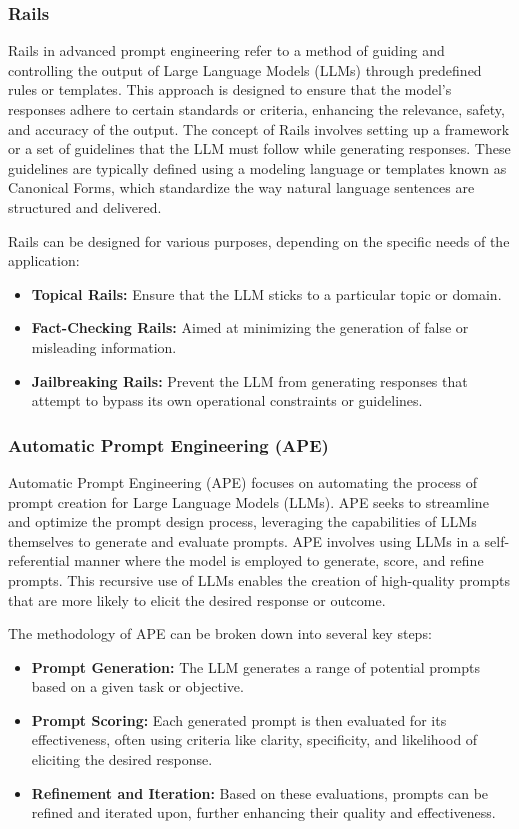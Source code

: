 \documentclass[conference]{IEEEtran}
\begin{document}
\subsubsection{Rails}
Rails in advanced prompt engineering refer to a method of guiding and controlling the output of Large Language Models (LLMs) through predefined rules or templates. This approach is designed to ensure that the model's responses adhere to certain standards or criteria, enhancing the relevance, safety, and accuracy of the output. The concept of Rails involves setting up a framework or a set of guidelines that the LLM must follow while generating responses. These guidelines are typically defined using a modeling language or templates known as Canonical Forms, which standardize the way natural language sentences are structured and delivered.

Rails can be designed for various purposes, depending on the specific needs of the application:
\begin{itemize}
    \item \textbf{Topical Rails:} Ensure that the LLM sticks to a particular topic or domain.
    \item \textbf{Fact-Checking Rails:} Aimed at minimizing the generation of false or misleading information.
    \item \textbf{Jailbreaking Rails:} Prevent the LLM from generating responses that attempt to bypass its own operational constraints or guidelines.
\end{itemize}


\subsubsection{Automatic Prompt Engineering (APE)}
Automatic Prompt Engineering (APE) \cite{zhou2023large} focuses on automating the process of prompt creation for Large Language Models (LLMs). APE seeks to streamline and optimize the prompt design process, leveraging the capabilities of LLMs themselves to generate and evaluate prompts. APE involves using LLMs in a self-referential manner where the model is employed to generate, score, and refine prompts. This recursive use of LLMs enables the creation of high-quality prompts that are more likely to elicit the desired response or outcome. 

The methodology of APE can be broken down into several key steps:
\begin{itemize}
    \item \textbf{Prompt Generation:} The LLM generates a range of potential prompts based on a given task or objective.
    \item \textbf{Prompt Scoring:} Each generated prompt is then evaluated for its effectiveness, often using criteria like clarity, specificity, and likelihood of eliciting the desired response.
    \item \textbf{Refinement and Iteration:} Based on these evaluations, prompts can be refined and iterated upon, further enhancing their quality and effectiveness.
\end{itemize}
\end{document}
